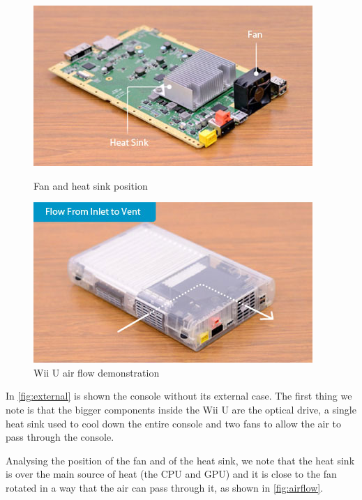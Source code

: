 \documentclass[11pt,a4paper,titlepage]{article}
\begin{document}
		\begin{figure}[ht]
			\centering
			\begin{minipage}{0.45\textwidth}
				\centering
				\includegraphics[width=\textwidth]{fan-heatsink.jpeg}
				\caption{Fan and heat sink position}
				\label{fig:fan-heatsink}
			\end{minipage}
			\begin{minipage}{0.45\textwidth}
				\centering
				\includegraphics[width=\textwidth]{air_flow.jpeg}
				\caption{Wii U air flow demonstration}
				\label{fig:airflow}
			\end{minipage}
		\end{figure}
		In \autoref{fig:external} is shown the console without its external case.
		The first thing we note is that the bigger components inside the Wii U are the optical drive, a single heat sink used to cool down the entire console and two fans to allow the air to pass through the console.

		Analysing the position of the fan and of the heat sink, we note that the heat sink is over the main source of heat (the CPU and GPU) and it is close to the fan rotated in a way that the air can pass through it, as shown in \autoref{fig:airflow}.
\end{document}
